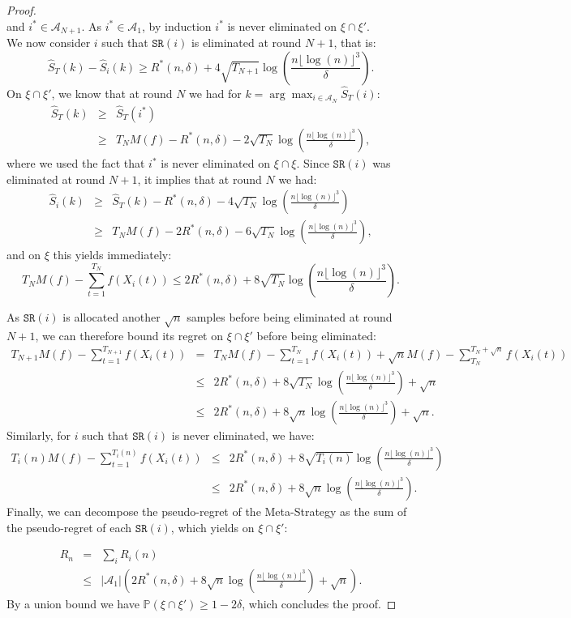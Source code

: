 \documentclass[final,12pt]{colt2018}
\newcommand{\floor}[1]{\lfloor #1 \rfloor}
\begin{document}
\begin{proof}
$$$$
and $i^* \in \mathcal A_{N+1}$. As $i^* \in \mathcal A_1$, by induction $i^*$ is never eliminated on $\xi \cap \xi'$.\\
We now consider $i$ such that $\texttt{SR}(i)$ is eliminated at round $N+1$, that is: 
$$
\widehat S_T(k)- \widehat S_{i}(k) \geq R^*(n,\delta) + 4\sqrt{T_{N+1}}\log\left(\frac{n\floor{\log(n)}^3}{\delta}\right).
$$
On $\xi \cap \xi'$, we know that at round $N$ we had for $k = \arg\max_{i \in \mathcal A_N} \widehat S_T(i)$:
\begin{eqnarray*}
\widehat S_T(k) & \geq & \widehat S_T(i^*)\\
& \geq & T_N M(f) - R^*(n,\delta) - 2\sqrt{T_N}\log\left(\frac{n\floor{\log(n)}^3}{\delta}\right),
\end{eqnarray*}
where we used the fact that $i^*$ is never eliminated on $\xi \cap \xi$. Since $\texttt{SR}(i)$ was eliminated at round $N+1$, it implies that at round $N$ we had:
\begin{eqnarray*}
\widehat S_{i}(k) & \geq & \widehat S_T(k) - R^*(n,\delta) - 4\sqrt{T_{N}}\log\left(\frac{n\floor{\log(n)}^3}{\delta}\right)\\
& \geq & T_N M(f) - 2R^*(n,\delta) - 6\sqrt{T_{N}}\log\left(\frac{n\floor{\log(n)}^3}{\delta}\right),
\end{eqnarray*}
and on $\xi$ this yields immediately:
$$
T_N M(f) - \sum_{t=1}^{T_N}f(X_i(t)) \leq  2R^*(n,\delta) + 8\sqrt{T_{N}}\log\left(\frac{n\floor{\log(n)}^3}{\delta}\right).
$$

As $\texttt{SR}(i)$ is allocated another $\sqrt{n}$ samples before being eliminated at round $N+1$, we can therefore bound its regret on $\xi \cap \xi'$ before being eliminated:
\begin{eqnarray*}
T_{N+1} M(f) - \sum_{t=1}^{T_{N+1}}f(X_i(t)) & = & T_N M(f) - \sum_{t=1}^{T_N}f(X_i(t)) + \sqrt{n}M(f) - \sum_{T_N}^{T_N+\sqrt{n}}f(X_i(t))\\
& \leq & 2R^*(n,\delta) + 8\sqrt{T_{N}}\log\left(\frac{n\floor{\log(n)}^3}{\delta}\right) + \sqrt{n}\\
& \leq & 2R^*(n,\delta) + 8\sqrt{n}\log\left(\frac{n\floor{\log(n)}^3}{\delta}\right) + \sqrt{n}.
\end{eqnarray*}
Similarly, for $i$ such that $\texttt{SR}(i)$ is never eliminated, we have:
\begin{eqnarray*}
T_i(n) M(f) - \sum_{t=1}^{T_i(n)}f(X_i(t)) & \leq & 2R^*(n,\delta) + 8\sqrt{T_i(n)}\log\left(\frac{n\floor{\log(n)}^3}{\delta}\right)\\
& \leq & 2R^*(n,\delta) + 8\sqrt{n}\log\left(\frac{n\floor{\log(n)}^3}{\delta}\right).
\end{eqnarray*}
Finally, we can decompose the pseudo-regret of the Meta-Strategy as the sum of the pseudo-regret of each $\texttt{SR}(i)$, which yields on $\xi \cap \xi'$:

\begin{eqnarray*}
R_n & = & \sum_i R_i(n)\\
& \leq & |\mathcal A_1| \left(2R^*(n,\delta) + 8\sqrt{n}\log\left(\frac{n\floor{\log(n)}^3}{\delta}\right) + \sqrt{n}\right).
\end{eqnarray*}
By a union bound we have $\mathbb P(\xi \cap \xi') \geq 1-2\delta$, which concludes the proof.
\end{proof}
\end{document}
